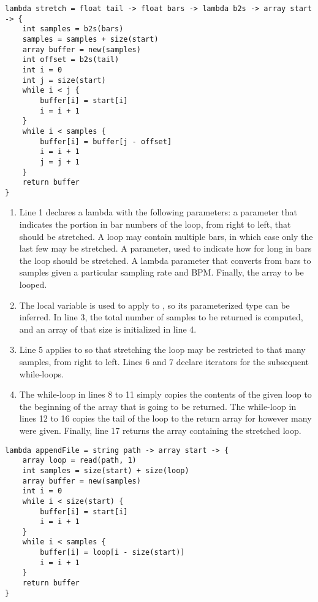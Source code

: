 \begin{lstlisting}[emph={lambda,float,array,int,size,new,while,return},emphstyle={\textbf},caption={Stretching a loop in \emph{Scandal}.},label={alg:stretch}]
lambda stretch = float tail -> float bars -> lambda b2s -> array start -> {
	int samples = b2s(bars)
	samples = samples + size(start)
	array buffer = new(samples)
	int offset = b2s(tail)
	int i = 0
	int j = size(start)
	while i < j {
		buffer[i] = start[i]
		i = i + 1
	}
	while i < samples {
		buffer[i] = buffer[j - offset]
		i = i + 1
		j = j + 1
	}
	return buffer
}
\end{lstlisting}

\begin{enumerate}
	\item Line 1 declares a  lambda with the following parameters: a  parameter that indicates the portion in bar numbers of the loop, from right to left, that should be stretched. A loop may contain multiple bars, in which case only the last few may be stretched. A  parameter, used to indicate how for long in bars the loop should be stretched. A lambda parameter that converts from bars to samples given a particular sampling rate and BPM. Finally, the array to be looped.
	\item The local variable  is used to apply  to , so its parameterized type can be inferred. In line 3, the total number of samples to be returned is computed, and an array of that size is initialized in line 4.
	\addtocounter{enumi}{2}
	\item Line 5 applies  to  so that stretching the loop may be restricted to that many samples, from right to left. Lines 6 and 7 declare iterators for the subsequent while-loops.
	\addtocounter{enumi}{2}
	\item The while-loop in lines 8 to 11 simply copies the contents of the given loop to the beginning of the array that is going to be returned. The while-loop in lines 12 to 16 copies the tail of the loop to the return array for however many  were given. Finally, line 17 returns the array containing the stretched loop.
\end{enumerate}

\begin{lstlisting}[emph={lambda,string,array,read,int,size,new,while,return},emphstyle={\textbf},caption={Appending the contents of a file to a given buffer.},label={alg:append}]
lambda appendFile = string path -> array start -> {
	array loop = read(path, 1)
	int samples = size(start) + size(loop)
	array buffer = new(samples)
	int i = 0
	while i < size(start) {
		buffer[i] = start[i]
		i = i + 1
	}
	while i < samples {
		buffer[i] = loop[i - size(start)]
		i = i + 1
	}
	return buffer
}
\end{lstlisting}


